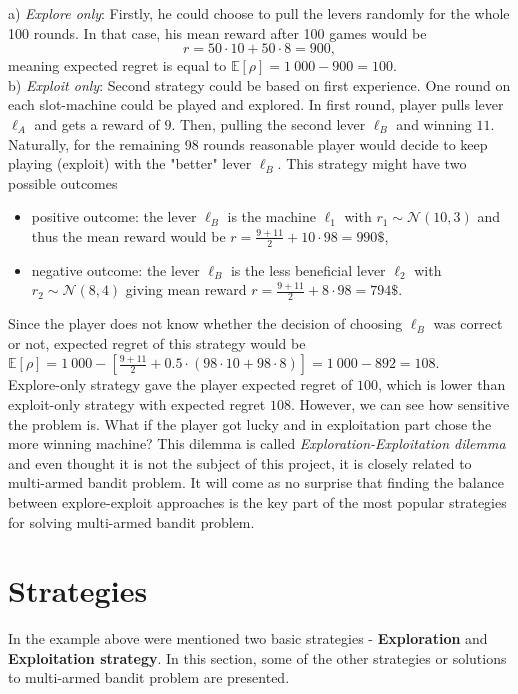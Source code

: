\documentclass[11pt,american,czech]{article}
\begin{document}
	a) \textit{Explore only}: Firstly, he could choose to pull the levers randomly for the whole 100 rounds. In that case, his mean reward after 100 games would be $$r = 50\cdot 10 + 50\cdot 8 = 900,$$ meaning expected regret  is equal to $\mathbb{E}[\rho] = 1~000-900=100$.\\
	
	b) \textit{Exploit only}: Second strategy could be based on first experience. One round on each slot-machine could be played and explored. In first round, player pulls lever $\ell_A$ and gets a reward of $9$. Then, pulling the second lever $\ell_B$ and winning $11 $. Naturally, for the remaining 98 rounds reasonable player would decide to keep playing (exploit) with the "better" lever $\ell_B$. This strategy might have two possible outcomes
	\begin{itemize}
		\item positive outcome: the lever $\ell_B$ is the machine $\ell_1$ with $r_1\sim\mathcal{N}(10,3)$ and thus the mean reward would be $r=\frac{9+11}{2}+10\cdot98=990\$$,
		\item negative outcome: the lever $\ell_B$ is the less beneficial lever $\ell_2$ with $r_2\sim\mathcal{N}(8,4)$ giving mean reward $r = \frac{9+11}{2}+8\cdot98=794\$$.
	\end{itemize}
	Since the player does not know whether the decision of choosing $\ell_B$ was correct or not, expected regret of this strategy would be $\mathbb{E}[\rho]=1~000 - [\frac{9+11}{2} + 0.5\cdot(98\cdot10 + 98\cdot8)] =1~000 - 892=108$.\\
	
	Explore-only strategy gave the player expected regret of $100$, which is lower than exploit-only strategy with expected regret $108$. However, we can see how sensitive the problem is. What if the player got lucky and in exploitation part chose the more winning machine? This dilemma is called \textit{Exploration-Exploitation dilemma} and even thought it is not the subject of this project, it is closely related to multi-armed bandit problem. It will come as no surprise that finding the balance between explore-exploit approaches is the key part of the most popular strategies for solving multi-armed bandit problem.
	\newpage
	\section*{Strategies}
	In the example above were mentioned two basic strategies - \textbf{Exploration} and \textbf{Exploitation strategy}. In this section, some of the other strategies or solutions to multi-armed bandit problem are presented.
\end{document}

